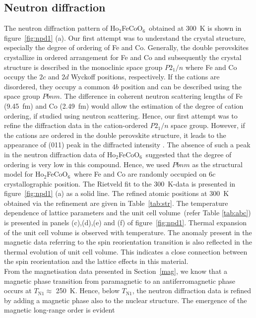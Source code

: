 \documentclass[12pt,twocolumns]{iopart}
\newcommand{\HFCO}{Ho$_2$FeCoO$_6$}
\begin{document}
\subsection{Neutron diffraction}
The neutron diffraction pattern of \HFCO\ obtained at 300~K
is shown in figure~\ref{fig:npd1} (a).
Our first attempt was to understand the crystal structure,
especially the degree of ordering of Fe and Co.
Generally, the double perovskites crystallize in ordered arrangement for Fe and Co and subsequently the crystal structure is described in the monoclinic space group $P2_1/n$ where Fe and Co occupy the $2c$ and $2d$ Wyckoff positions, respectively.
If the cations are disordered, they occupy a common $4b$ position 
and can be described using the space group $Pbnm$.
The difference in coherent neutron scattering lengths of Fe (9.45~fm)
and Co (2.49~fm) would allow the estimation of the degree of cation ordering,
if studied using neutron scattering.
%
Hence, our first attempt was to refine the diffraction data in
the cation-ordered $P2_1/n$ space group.
However, if the cations are ordered in the double perovskite structure,
it leads to the appearance of (011) peak in the diffracted intensity \cite{baron2011effect}.
The absence of such a peak in the neutron diffraction data of \HFCO\ suggested
that the degree of ordering is very low in this compound.
Hence, we used $Pbnm$ as the structural model for \HFCO\ where
Fe and Co are randomly occupied on $6c$ crystallographic position.
The Rietveld fit to the 300~K-data is presented in
figure~\ref{fig:npd1} (a) as a solid line.
The refined atomic positions  at 300~K obtained via
the refinement are given in Table~\ref{tab:str}. The temperature dependence of lattice parameters and the unit cell volume~(refer Table \ref{tab:abc}) is presented in panels (c),(d),(e) and (f) of figure~\ref{fig:npd1}. Thermal expansion of the unit cell volume is observed with temperature. The anomaly present in the magnetic data referring to the spin reorientation transition is also reflected in the thermal evolution of unit cell volume. This indicates a close connection between the spin reorientation and the lattice effects in this material.\\
From the magnetisation data presented in Section~\ref{mag},
we know that a magnetic phase
transition from paramagnetic to an antiferromagnetic phase
occurs at $T_\mathrm{N1}\approx$ 250~K.
Hence, below $T_\mathrm{N1}$, the neutron diffraction data is
refined by adding a magnetic phase also to the nuclear structure.
The emergence of the magnetic long-range order is evident
\end{document}
